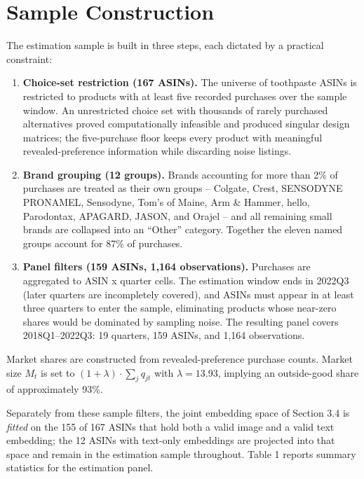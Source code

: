 \section{Sample Construction}\label{sample-construction}

The estimation sample is built in three steps, each dictated by a
practical constraint:

\begin{enumerate}
\def\labelenumi{\arabic{enumi}.}
\item
  \textbf{Choice-set restriction (167 ASINs).} The universe of
  toothpaste ASINs is restricted to products with at least five recorded
  purchases over the sample window. An unrestricted choice set with
  thousands of rarely purchased alternatives proved computationally
  infeasible and produced singular design matrices; the five-purchase
  floor keeps every product with meaningful revealed-preference
  information while discarding noise listings.
\item
  \textbf{Brand grouping (12 groups).} Brands accounting for more than
  2\% of purchases are treated as their own groups -- Colgate, Crest,
  SENSODYNE PRONAMEL, Sensodyne, Tom's of Maine, Arm \& Hammer, hello,
  Parodontax, APAGARD, JASON, and Orajel -- and all remaining small
  brands are collapsed into an ``Other'' category. Together the eleven
  named groups account for 87\% of purchases.
\item
  \textbf{Panel filters (159 ASINs, 1,164 observations).} Purchases are
  aggregated to ASIN x quarter cells. The estimation window ends in
  2022Q3 (later quarters are incompletely covered), and ASINs must
  appear in at least three quarters to enter the sample, eliminating
  products whose near-zero shares would be dominated by sampling noise.
  The resulting panel covers 2018Q1--2022Q3: 19 quarters, 159 ASINs, and
  1,164 observations.
\end{enumerate}

Market shares are constructed from revealed-preference purchase counts.
Market size \(M_t\) is set to \((1 + \lambda) \cdot \sum_j q_{jt}\) with
\(\lambda = 13.93\), implying an outside-good share of approximately
93\%.

Separately from these sample filters, the joint embedding space of
Section 3.4 is \emph{fitted} on the 155 of 167 ASINs that hold both a
valid image and a valid text embedding; the 12 ASINs with text-only
embeddings are projected into that space and remain in the estimation
sample throughout. Table 1 reports summary statistics for the estimation
panel.

